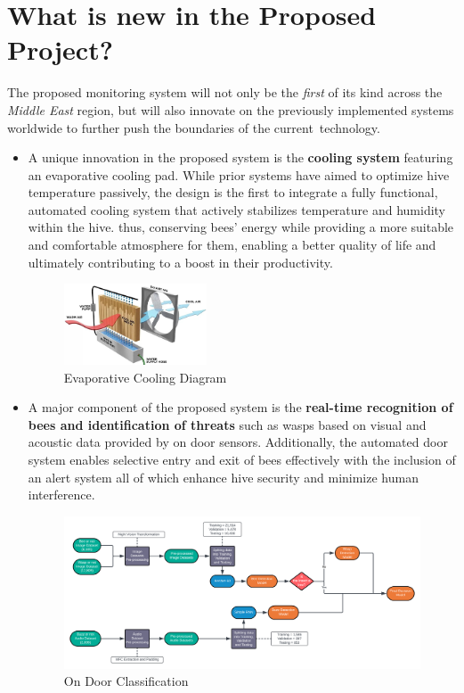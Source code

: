 \documentclass[12pt]{article}
\begin{document}
	\section{What is new in the Proposed Project?}
The proposed monitoring system will not only be the \textit{first} of its kind across the \textit{Middle East} region, but will also innovate on the previously implemented systems worldwide to further push the boundaries of the current technology. \\
	\begin{itemize}
		\item A unique innovation in the proposed system is the \textbf{cooling system} featuring an evaporative cooling pad. While prior systems have aimed to optimize hive temperature passively, the design is the first to integrate a fully functional, automated cooling system that actively stabilizes temperature and humidity within the hive. thus, conserving bees' energy while providing a more suitable and comfortable atmosphere  for them, enabling a better quality of life and ultimately contributing to a boost in their productivity. \\
		\begin{figure}[H]
			\centering
			\includegraphics[width=0.4\textwidth]{Images/swamp-cooler-diagram.jpg}
			\caption{Evaporative Cooling Diagram \cite{powerbreezer2021}}
			\label{fig:EVAPORATIVE_COOLER}
		\end{figure}
		
		\item A major component of the proposed system is the \textbf{real-time recognition of bees and identification of threats} such as wasps based on visual and acoustic data provided by on door sensors. Additionally, the automated door system enables selective entry and exit of bees effectively with the inclusion of an alert system all of which enhance hive security and minimize human interference.
		\begin{figure}[H]
			\vspace{2 cm}
			\centering
			\includegraphics[width=\textwidth]{Images/Pipelines/On Door Classifier Pipeline Diagram.png}
			\caption{On Door Classification}
			\label{fig:DOOR_CLASSIFICATION}
						\vspace{2 cm}
		\end{figure}
	\end{itemize}
\end{document}

